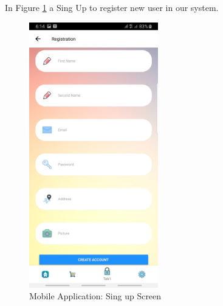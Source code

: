 In Figure \ref{fig: singup} a Sing Up to register new user in our system.
\begin{figure}[htp]%
    \center%
    \includegraphics[width=0.5\textwidth]{images/Software/signup.jpg}%
    \caption[Mobile Application: Sing up Screen]{Mobile Application: Sing up Screen}\label{fig: singup}%
  \end{figure}
\newpage


